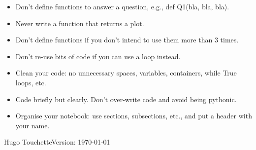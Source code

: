 \documentclass[11pt,a4paper]{article}
\begin{document}
\begin{itemize}
\item Don't define functions to answer a question, e.g., def Q1(bla, bla, bla).
\item Never write a function that returns a plot.
\item Don't define functions if you don't intend to use them more than 3 times.
\item Don't re-use bits of code if you can use a loop instead.
\item Clean your code: no unnecessary spaces, variables, containers, while True loops, etc. 
\item Code briefly but clearly. Don't over-write code and avoid being pythonic.
\item Organise your notebook: use sections, subsections, etc., and put a header with your name.
\end{itemize}

\vfill
Hugo Touchette\hfill Version: \today\ \currenttime
\end{document}
